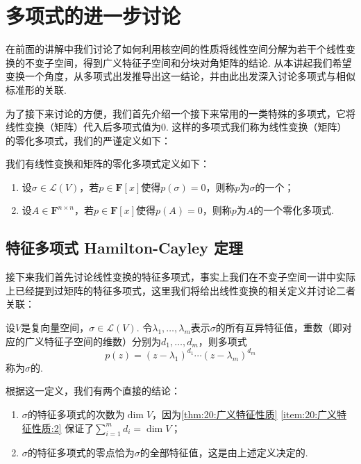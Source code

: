 \chapter{多项式的进一步讨论}

在前面的讲解中我们讨论了如何利用核空间的性质将线性空间分解为若干个线性变换的不变子空间，得到广义特征子空间和分块对角矩阵的结论. 从本讲起我们希望变换一个角度，从多项式出发推导出这一结论，并由此出发深入讨论多项式与相似标准形的关联.

为了接下来讨论的方便，我们首先介绍一个接下来常用的一类特殊的多项式，它将线性变换（矩阵）代入后多项式值为0. 这样的多项式我们称为线性变换（矩阵）的零化多项式，我们的严谨定义如下：
\begin{definition}[零化多项式] 
    我们有线性变换和矩阵的零化多项式定义如下：
    \begin{enumerate}
        \item 设$\sigma\in \mathcal{L}(V)$，若$p\in\mathbf{F}[x]$使得$p(\sigma)=0$，则称$p$为$\sigma$的一个；

        \item 设$A\in\mathbf{F}^{n\times n}$，若$p\in\mathbf{F}[x]$使得$p(A)=0$，则称$p$为$A$的一个零化多项式.
    \end{enumerate}
\end{definition}

\section{特征多项式 \quad Hamilton-Cayley 定理}

接下来我们首先讨论线性变换的特征多项式，事实上我们在不变子空间一讲中实际上已经提到过矩阵的特征多项式，这里我们将给出线性变换的相关定义并讨论二者关联：
\begin{definition}[特征多项式] 
    设$V$是复向量空间，$\sigma\in \mathcal{L}(V)$. 令$\lambda_1,\ldots,\lambda_m$表示$\sigma$的所有互异特征值，重数（即对应的广义特征子空间的维数）分别为$d_1,\ldots,d_m$，则多项式
    \begin{equation}\label{eq:21:线性变换特征多项式}
        p(z)=(z-\lambda_1)^{d_1}\cdots(z-\lambda_m)^{d_m}
    \end{equation}
    称为$\sigma$的.
\end{definition}

根据这一定义，我们有两个直接的结论：
\begin{enumerate}
    \item $\sigma$的特征多项式的次数为$\dim V$，因为\autoref{thm:20:广义特征性质} \ref*{item:20:广义特征性质:2} 保证了$\displaystyle\sum_{i=1}^m d_i=\dim V$；

    \item $\sigma$的特征多项式的零点恰为$\sigma$的全部特征值，这是由上述定义决定的.
\end{enumerate}

